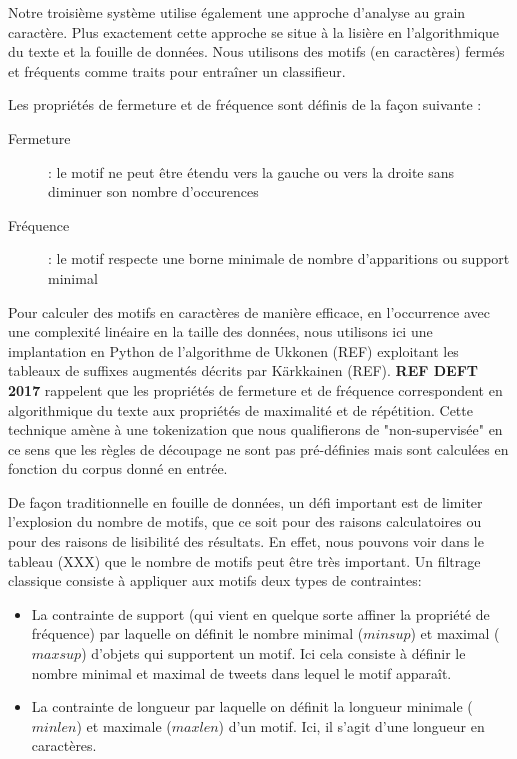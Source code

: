  Notre troisième système utilise également une approche d'analyse au grain caractère. Plus exactement cette approche se situe à la lisière en l'algorithmique du texte et la fouille de données.
 Nous utilisons des motifs (en caractères) fermés et fréquents comme traits pour entraîner un classifieur.

 Les propriétés de fermeture et de fréquence sont définis de la façon suivante :%
\begin{description}
\item[Fermeture]: le motif ne peut être étendu vers la gauche ou vers la droite sans diminuer son nombre d'occurences
\item[Fréquence]: le motif respecte une borne minimale de nombre d'apparitions ou support minimal
\end{description}

 Pour calculer des motifs en caractères de manière efficace, en l'occurrence avec une complexité linéaire en la taille des données, nous utilisons ici une implantation en Python de l'algorithme de Ukkonen (REF) exploitant les tableaux de suffixes augmentés décrits par Kärkkainen (REF).
 \textbf{REF DEFT 2017} rappelent que les propriétés de fermeture et de fréquence correspondent en algorithmique du texte aux propriétés de maximalité et de répétition.
 Cette technique amène à une tokenization que nous qualifierons de "non-supervisée" en ce sens que les règles de découpage ne sont pas pré-définies mais sont calculées en fonction du corpus donné en entrée.%
 
 De façon traditionnelle en fouille de données, un défi important est de limiter l'explosion du nombre de motifs, que ce soit pour des raisons calculatoires ou pour des raisons de lisibilité des résultats. En effet, nous pouvons voir dans le tableau (XXX) que le nombre de motifs peut être très important.
 Un filtrage classique consiste à appliquer aux motifs deux types de contraintes:
\begin{itemize}
  \item La contrainte de support (qui vient en quelque sorte affiner la propriété de fréquence) par laquelle on définit le nombre minimal ($minsup$) et maximal ($maxsup$) d'objets qui supportent un motif. Ici cela consiste à définir le nombre minimal et maximal de tweets dans lequel le motif apparaît.
  \item La contrainte de longueur par laquelle on définit la longueur minimale ($minlen$) et maximale ($maxlen$) d'un motif. Ici, il s'agit d'une longueur en caractères.
\end{itemize}

